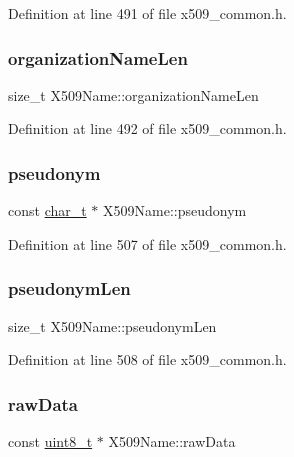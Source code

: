 Definition at line 491 of file x509\+\_\+common.\+h.

\mbox{\label{structX509Name_af2841192675d2bd0f999533a723d1c1d}} 
\subsubsection{\texorpdfstring{organization\+Name\+Len}{organizationNameLen}}
{\footnotesize\ttfamily size\+\_\+t X509\+Name\+::organization\+Name\+Len}



Definition at line 492 of file x509\+\_\+common.\+h.

\mbox{\label{structX509Name_ac157a7985fd1b9ea07893de309947823}} 
\subsubsection{\texorpdfstring{pseudonym}{pseudonym}}
{\footnotesize\ttfamily const \hyperlink{compiler__port_8h_a40bb5262bf908c328fbcfbe5d29d0201}{char\+\_\+t} $\ast$ X509\+Name\+::pseudonym}



Definition at line 507 of file x509\+\_\+common.\+h.

\mbox{\label{structX509Name_a701db328dc75e341e16cc03f65abf062}} 
\subsubsection{\texorpdfstring{pseudonym\+Len}{pseudonymLen}}
{\footnotesize\ttfamily size\+\_\+t X509\+Name\+::pseudonym\+Len}



Definition at line 508 of file x509\+\_\+common.\+h.

\mbox{\label{structX509Name_a16f889e11f79b38a1ade245692857253}} 
\subsubsection{\texorpdfstring{raw\+Data}{rawData}}
{\footnotesize\ttfamily const \hyperlink{stdint_8h_aba7bc1797add20fe3efdf37ced1182c5}{uint8\+\_\+t} $\ast$ X509\+Name\+::raw\+Data}



